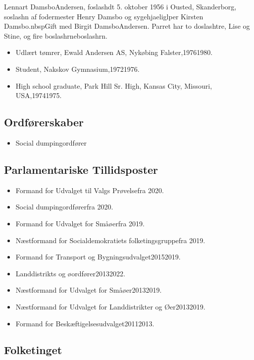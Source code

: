 \documentclass[11pt, a4paper]{awesome-cv}
\begin{document}
\makecvheader[R]
\makelettertitle
\begin{cvletter}
Lennart DamsboAndersen, foslashdt 5. oktober 1956 i Ousted, Skanderborg, soslashn af fodermester Henry Damsbo og sygehjaeliglper Kirsten Damsbo.nbspGift med Birgit DamsboAndersen. Parret har to doslashtre, Lise og Stine, og fire boslashrneboslashrn.

\begin{itemize}
\item Udlært tømrer, Ewald Andersen AS, Nykøbing Falster,19761980.
\item Student, Nakskov Gymnasium,19721976.
\item High school graduate, Park Hill Sr. High, Kansas City, Missouri, USA,19741975.
\end{itemize}
\subsection*{Ordførerskaber}
\begin{itemize}
\item Social dumpingordfører
\end{itemize}
\subsection*{Parlamentariske Tillidsposter}
\begin{itemize}
\item Formand for Udvalget til Valgs Prøvelsefra 2020.
\item Social dumpingordførerfra 2020.
\item Formand for Udvalget for Småøerfra 2019.
\item Næstformand for Socialdemokratiets folketingsgruppefra 2019.
\item Formand for Transport og Bygningsudvalget20152019.
\item Landdistrikts og øordfører20132022.
\item Næstformand for Udvalget for Småøer20132019.
\item Næstformand for Udvalget for Landdistrikter og Øer20132019.
\item Formand for Beskæftigelsesudvalget20112013.
\end{itemize}
\subsection*{Folketinget}

\end{cvletter}
\end{document}
